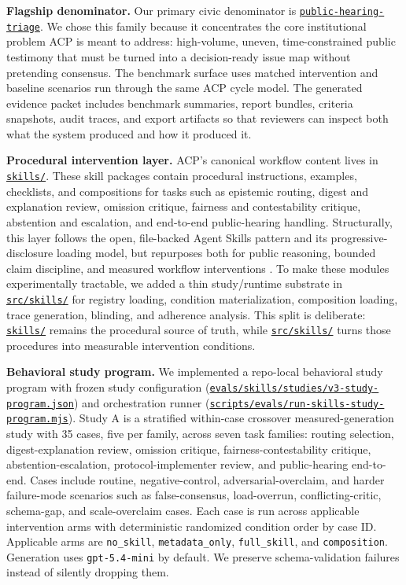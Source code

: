 \documentclass[11pt]{article}
\newcommand{\repobase}{https://github.com/davidkimai/acp}
\newcommand{\repodir}[2]{\href{\repobase/tree/main/#1}{\nolinkurl{#2}}}
\newcommand{\repofile}[2]{\href{\repobase/blob/main/#1}{\nolinkurl{#2}}}
\begin{document}
\vspace{0.1in}
\textbf{Flagship denominator.} Our primary civic denominator is \href{https://github.com/davidkimai/acp/tree/main/benchmarks/scenarios/public-hearing-triage}{\texttt{public-hearing-triage}}. We chose this family because it concentrates the core institutional problem ACP is meant to address: high-volume, uneven, time-constrained public testimony that must be turned into a decision-ready issue map without pretending consensus. The benchmark surface uses matched intervention and baseline scenarios run through the same ACP cycle model. The generated evidence packet includes benchmark summaries, report bundles, criteria snapshots, audit traces, and export artifacts so that reviewers can inspect both what the system produced and how it produced it.

\vspace{0.1in}
\textbf{Procedural intervention layer.} ACP's canonical workflow content lives in \repodir{skills}{skills/}. These skill packages contain procedural instructions, examples, checklists, and compositions for tasks such as epistemic routing, digest and explanation review, omission critique, fairness and contestability critique, abstention and escalation, and end-to-end public-hearing handling. Structurally, this layer follows the open, file-backed Agent Skills pattern and its progressive-disclosure loading model, but repurposes both for public reasoning, bounded claim discipline, and measured workflow interventions \cite{Anthropic2025AgentSkills,AgentSkills2026Overview}. To make these modules experimentally tractable, we added a thin study/runtime substrate in \repodir{src/skills}{src/skills/} for registry loading, condition materialization, composition loading, trace generation, blinding, and adherence analysis. This split is deliberate: \repodir{skills}{skills/} remains the procedural source of truth, while \repodir{src/skills}{src/skills/} turns those procedures into measurable intervention conditions.

\vspace{0.1in}
\textbf{Behavioral study program.} We implemented a repo-local behavioral study program with frozen study configuration (\repofile{evals/skills/studies/v3-study-program.json}{evals/skills/studies/v3-study-program.json}) and orchestration runner (\repofile{scripts/evals/run-skills-study-program.mjs}{scripts/evals/run-skills-study-program.mjs}). Study A is a stratified within-case crossover measured-generation study with 35 cases, five per family, across seven task families: routing selection, digest-explanation review, omission critique, fairness-contestability critique, abstention-escalation, protocol-implementer review, and public-hearing end-to-end. Cases include routine, negative-control, adversarial-overclaim, and harder failure-mode scenarios such as false-consensus, load-overrun, conflicting-critic, schema-gap, and scale-overclaim cases. Each case is run across applicable intervention arms with deterministic randomized condition order by case ID. Applicable arms are \texttt{no\_skill}, \texttt{metadata\_only}, \texttt{full\_skill}, and \texttt{composition}. Generation uses \texttt{gpt-5.4-mini} by default. We preserve schema-validation failures instead of silently dropping them.
\end{document}
